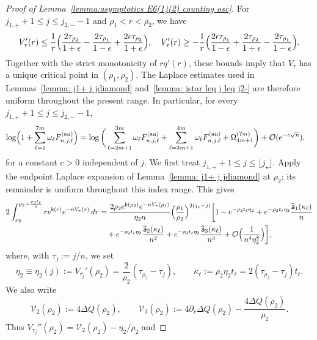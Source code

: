 \documentclass[a4paper]{article}
\numberwithin{equation}{section}
\begin{document}
\begin{proof}[Proof of Lemma~\ref{lemma:asymptotics E6(1)(2) counting osc}]
For $j_{1,+}+1\le j\le j_{2,-}-1$ and $\rho_1<r<\rho_2$, we have
\[
    V_{\tau}'(r)\leq\frac{1}{r}\Bigl(\frac{2\tau_{\rho_2}}{1+\epsilon}-\frac{2\tau_{\rho_1}}{1-\epsilon}
    +\frac{2\epsilon\tau_{\rho_2}}{1+\epsilon}\Bigr), 
    \quad
    V_{\tau}'(r)\geq -\frac{1}{r}\Bigl(\frac{2\epsilon\tau_{\rho_1}}{1-\epsilon}+\frac{2\tau_{\rho_2}}{1+\epsilon}-\frac{2\tau_{\rho_1}}{1-\epsilon}\Bigr).
\]
Together with the strict monotonicity of $r q'(r)$, these bounds imply that
$V_\tau$ has a unique critical point in $(\rho_1,\rho_2)$.  The Laplace
estimates used in Lemmas~\ref{lemma: j1+ j jdiamond}
and~\ref{lemma: jstar leq j leq j2-} are therefore uniform throughout the
present range.  In particular, for every
$j_{1,+}+1\le j\le j_{2,-}-1$,
\begin{align*}
\log\Bigl(1+\sum_{\ell=1}^{7m}\omega_\ell
F_{n,j,\ell}^{(\mathrm{an})}\Bigr)
&=
\log\bigg(
\sum_{\ell=2m+1}^{3m}\omega_{\ell}F_{n,j,\ell}^{(\mathrm{an})}
+\sum_{\ell=3m+1}^{4m}\omega_{\ell}F_{n,j,\ell}^{(\mathrm{an})}
+\Omega_{4m+1}^{(7m)}\bigg)+\mathcal{O}(e^{-c\sqrt{n}}).
\end{align*}
for a constant $c>0$ independent of $j$.  We first treat
$j_{1,+}+1\le j\le\lfloor j_\star\rfloor$.  Apply the endpoint Laplace
expansion of Lemma~\ref{lemma: j1+ j jdiamond} at $\rho_2$; its remainder is
uniform throughout this index range.  This gives
\begin{align*}
2\int_{\rho_2}^{\rho_2+\frac{\rho_2t_{\ell}}{n}}re^{\mathsf{k}(r)}e^{-nV_{\tau}(r)}\,dr 
&=
\frac{2\rho_2e^{\mathsf{k}(\rho_2)}e^{-nV_{\tau}(\rho_1)}}{\eta_2n}
\Bigl(\frac{\rho_1}{\rho_2}\Bigr)^{2(j_{\star}-j)}
\bigg[
1-e^{-\rho_2t_{\ell}\eta_2}
+
e^{-\rho_2t_{\ell}\eta_2}\frac{\widetilde{\mathsf{a}}_1(\kappa_{\ell})}{n}
\\
&\quad
+e^{-\rho_2t_{\ell}\eta_2}\frac{\widetilde{\mathsf{a}}_2(\kappa_{\ell})}{n^2}
+e^{-\rho_2t_{\ell}\eta_2}\frac{\widetilde{\mathsf{a}}_3(\kappa_{\ell})}{n^3}
+\mathcal{O}\Bigl(\frac{1}{n^4\eta_2^8}\Bigr)
\bigg],
\end{align*}
where, with $\tau_j:=j/n$, we set
\[
\eta_2\equiv\eta_2(j):=V_{\tau_j}'(\rho_2)
=\frac{2}{\rho_2}(\tau_{\rho_2}-\tau_j),
\qquad
\kappa_{\ell}:=\rho_2\eta_2t_{\ell}
=2(\tau_{\rho_2}-\tau_j)t_{\ell}.
\]
We also write
\[
\mathcal V_2(\rho_2):=4\Delta Q(\rho_2),\qquad
\mathcal V_3(\rho_2):=4\partial_r\Delta Q(\rho_2)-\frac{4\Delta Q(\rho_2)}{\rho_2}.
\]
Thus $V_{\tau_j}''(\rho_2)=\mathcal V_2(\rho_2)-\eta_2/\rho_2$ and

\end{proof}
\end{document}

